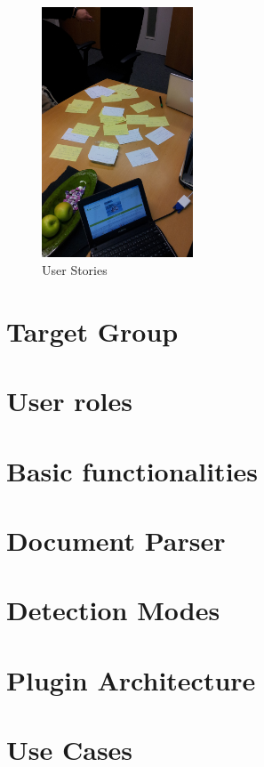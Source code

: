 \begin{figure}[!h]
    \includegraphics[width=0.4\textwidth]{images/2011-11-15-user-stories-5.jpg}
  \caption{User Stories}
  \label{fig:userStories}
\end{figure}

\section{Target Group}

\section{User roles}

\section{Basic functionalities}

\section{Document Parser}

\section{Detection Modes}

\section{Plugin Architecture}

\section{Use Cases}
